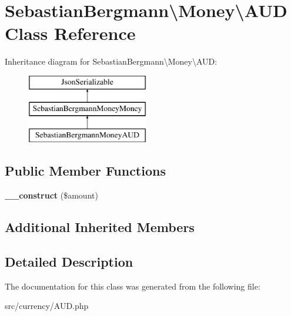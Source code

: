 \hypertarget{classSebastianBergmann_1_1Money_1_1AUD}{}\section{Sebastian\+Bergmann\textbackslash{}Money\textbackslash{}A\+U\+D Class Reference}
\label{classSebastianBergmann_1_1Money_1_1AUD}
Inheritance diagram for Sebastian\+Bergmann\textbackslash{}Money\textbackslash{}A\+U\+D\+:\begin{figure}[H]
\begin{center}
\leavevmode
\includegraphics[height=3.000000cm]{classSebastianBergmann_1_1Money_1_1AUD}
\end{center}
\end{figure}
\subsection*{Public Member Functions}
\begin{DoxyCompactItemize}
\item 
\hypertarget{classSebastianBergmann_1_1Money_1_1AUD_abfaf5097dbc8ffe7cb420da68f4fe49b}{}{\bfseries \+\_\+\+\_\+construct} (\$amount)\label{classSebastianBergmann_1_1Money_1_1AUD_abfaf5097dbc8ffe7cb420da68f4fe49b}

\end{DoxyCompactItemize}
\subsection*{Additional Inherited Members}


\subsection{Detailed Description}


The documentation for this class was generated from the following file\+:\begin{DoxyCompactItemize}
\item 
src/currency/A\+U\+D.\+php\end{DoxyCompactItemize}
